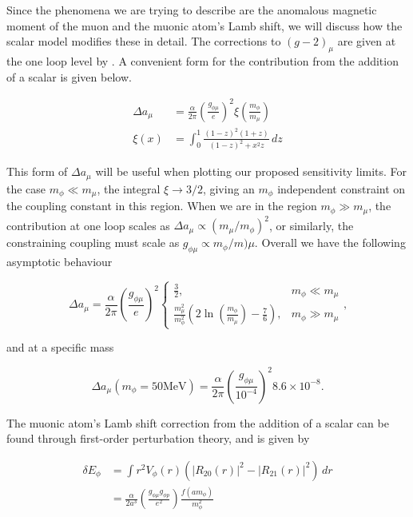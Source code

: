 Since the phenomena we are trying to describe are the anomalous magnetic moment of the muon and the muonic atom's Lamb shift, we will discuss how the scalar model modifies these in detail.
The corrections to $(g-2)_\mu$ are given at the one loop level by \cite{Leveille:1977rc, McKeen:2009ny, TuckerSmith:2010ra}.
A convenient form for the contribution from the addition of a scalar is given below.

\begin{align}
    \Delta a_\mu &= \frac{\alpha}{2\pi} \left(\frac{g_{\phi\mu}}{e}\right)^2 \xi\left(\frac{m_\phi}{m_\mu}\right) \\
    \xi(x) &= \int_0^1 \frac{(1-z)^2(1+z)}{(1-z)^2 + x^2z} \,dz
\end{align}

\noindent This form of $\Delta a_\mu$ will be useful when plotting our proposed sensitivity limits.
For the case $m_\phi \ll m_\mu$, the integral $\xi \rightarrow 3/2$, giving an $m_\phi$ independent constraint on the coupling constant in this region.
When we are in the region $m_\phi \gg m_\mu$, the contribution at one loop scales as $\Delta a_\mu \propto (m_\mu/m_\phi)^2$, or similarly, the constraining coupling must scale as $g_{\phi\mu} \propto m_\phi / m)\mu$.
Overall we have the following asymptotic behaviour

\begin{equation}
    \Delta a_\mu = \frac{\alpha}{2\pi} \left(\frac{g_{\phi \mu}}{e}\right)^2
    \begin{cases}
        \frac{3}{2}, & m_\phi \ll m_\mu \\
        \frac{m_\mu^2}{m_\phi^2} \left(2\ln\left(\frac{m_\phi}{m_\mu}\right) - \frac{7}{6}\right), & m_\phi \gg m_\mu
    \end{cases}\textrm{,}
\end{equation}

\noindent and at a specific mass

\begin{equation}
    \Delta a_\mu\left(m_\phi = 50\textrm{MeV}\right) = \frac{\alpha}{2\pi} \left(\frac{g_{\phi\mu}}{10^{-4}}\right)^2 8.6\times 10^{-8}\textrm{.}
\end{equation}

The muonic atom's Lamb shift correction from the addition of a scalar can be found through first-order perturbation theory, and is given by \cite{TuckerSmith:2010ra, Carlson:2015jba}

\begin{align}
    \delta E_\phi &= \int r^2 V_\phi(r)\left(\left|R_{20}(r)\right|^2 - \left|R_{21}(r)\right|^2\right)\,dr \\
                  &= \frac{\alpha}{2 a^3} \left(\frac{g_{\phi\mu} g_{\phi p}}{e^2}\right) \frac{f(a m_\phi)}{m_\phi^2}
\end{align}

